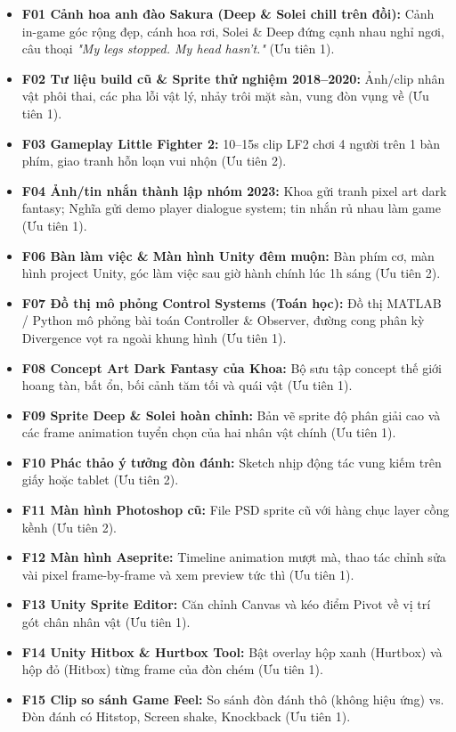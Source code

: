 \documentclass[11pt,a4paper]{article}
\newcommand{\tickbox}{\fbox{\rule{0pt}{0.75em}\hspace{0.75em}}}
\begin{document}
\begin{itemize}[label=\tickbox]
    \item \textbf{F01 Cảnh hoa anh đào Sakura (Deep \& Solei chill trên đồi):} Cảnh in-game góc rộng đẹp, cánh hoa rơi, Solei \& Deep đứng cạnh nhau nghỉ ngơi, câu thoại \textit{"My legs stopped. My head hasn't."} (Ưu tiên 1).
    \item \textbf{F02 Tư liệu build cũ \& Sprite thử nghiệm 2018–2020:} Ảnh/clip nhân vật phôi thai, các pha lỗi vật lý, nhảy trôi mặt sàn, vung đòn vụng về (Ưu tiên 1).
    \item \textbf{F03 Gameplay Little Fighter 2:} 10–15s clip LF2 chơi 4 người trên 1 bàn phím, giao tranh hỗn loạn vui nhộn (Ưu tiên 2).
    \item \textbf{F04 Ảnh/tin nhắn thành lập nhóm 2023:} Khoa gửi tranh pixel art dark fantasy; Nghĩa gửi demo player dialogue system; tin nhắn rủ nhau làm game (Ưu tiên 1).
    \item \textbf{F06 Bàn làm việc \& Màn hình Unity đêm muộn:} Bàn phím cơ, màn hình project Unity, góc làm việc sau giờ hành chính lúc 1h sáng (Ưu tiên 2).
    \item \textbf{F07 Đồ thị mô phỏng Control Systems (Toán học):} Đồ thị MATLAB / Python mô phỏng bài toán Controller \& Observer, đường cong phân kỳ Divergence vọt ra ngoài khung hình (Ưu tiên 1).
    \item \textbf{F08 Concept Art Dark Fantasy của Khoa:} Bộ sưu tập concept thế giới hoang tàn, bất ổn, bối cảnh tăm tối và quái vật (Ưu tiên 1).
    \item \textbf{F09 Sprite Deep \& Solei hoàn chỉnh:} Bản vẽ sprite độ phân giải cao và các frame animation tuyển chọn của hai nhân vật chính (Ưu tiên 1).
    \item \textbf{F10 Phác thảo ý tưởng đòn đánh:} Sketch nhịp động tác vung kiếm trên giấy hoặc tablet (Ưu tiên 2).
    \item \textbf{F11 Màn hình Photoshop cũ:} File PSD sprite cũ với hàng chục layer cồng kềnh (Ưu tiên 2).
    \item \textbf{F12 Màn hình Aseprite:} Timeline animation mượt mà, thao tác chỉnh sửa vài pixel frame-by-frame và xem preview tức thì (Ưu tiên 1).
    \item \textbf{F13 Unity Sprite Editor:} Căn chỉnh Canvas và kéo điểm Pivot về vị trí gót chân nhân vật (Ưu tiên 1).
    \item \textbf{F14 Unity Hitbox \& Hurtbox Tool:} Bật overlay hộp xanh (Hurtbox) và hộp đỏ (Hitbox) từng frame của đòn chém (Ưu tiên 1).
    \item \textbf{F15 Clip so sánh Game Feel:} So sánh đòn đánh thô (không hiệu ứng) vs. Đòn đánh có Hitstop, Screen shake, Knockback (Ưu tiên 1).

\end{itemize}
\end{document}
